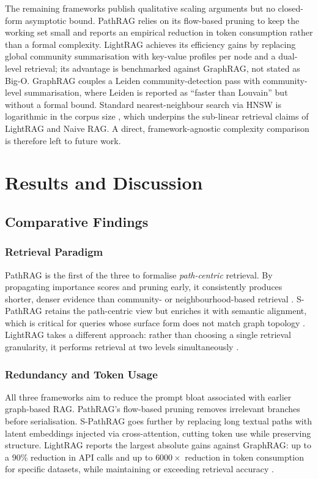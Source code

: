 \documentclass[12pt,a4paper,oneside]{report}
\begin{document}
The remaining frameworks publish qualitative scaling arguments but
no closed-form asymptotic bound. PathRAG \citep{chen2025pathrag}
relies on its flow-based pruning to keep the working set small and
reports an empirical reduction in token consumption rather than a
formal complexity. LightRAG \citep{guo2025lightrag} achieves its
efficiency gains by replacing global community summarisation with
key-value profiles per node and a dual-level retrieval; its
advantage is benchmarked against GraphRAG, not stated as Big-O.
GraphRAG \citep{edge2024} couples a Leiden community-detection pass
\citep{traag2019leiden} with community-level summarisation, where
Leiden is reported as ``faster than Louvain'' but without a formal
bound. Standard nearest-neighbour search via HNSW is logarithmic in
the corpus size \citep{malkov2018hnsw}, which underpins the
sub-linear retrieval claims of LightRAG and Naive RAG. A direct,
framework-agnostic complexity comparison is therefore left to future
work.


\chapter{Results and Discussion}
\label{ch:results}

\section{Comparative Findings}

\subsection{Retrieval Paradigm}
PathRAG is the first of the three to formalise \emph{path-centric}
retrieval. By propagating importance scores and pruning early, it
consistently produces shorter, denser evidence than community- or
neighbourhood-based retrieval \citep{chen2025pathrag}. S-PathRAG retains the
path-centric view but enriches it with semantic alignment, which is critical
for queries whose surface form does not match graph topology
\citep{fu2026spathrag}. LightRAG takes a different approach: rather than
choosing a single retrieval granularity, it performs retrieval at two levels
simultaneously \citep{guo2025lightrag}.

\subsection{Redundancy and Token Usage}
All three frameworks aim to reduce the prompt bloat associated with earlier
graph-based RAG. PathRAG's flow-based pruning removes irrelevant branches
before serialisation. S-PathRAG goes further by replacing long textual paths
with latent embeddings injected via cross-attention, cutting token use while
preserving structure. LightRAG reports the largest absolute gains against
GraphRAG: up to a $90\%$ reduction in API calls and up to $6000\times$
reduction in token consumption for specific datasets, while maintaining or
exceeding retrieval accuracy \citep{guo2025lightrag}.
\end{document}
